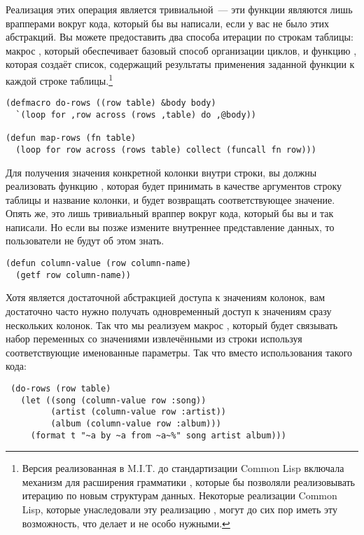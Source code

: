Реализация этих операция является тривиальной~--- эти функции являются лишь врапперами
вокруг кода, который бы вы написали, если у вас не было этих абстракций.  Вы можете
предоставить два способа итерации по строкам таблицы: макрос , который
обеспечивает базовый способ организации циклов, и функцию , которая создаёт
список, содержащий результаты применения заданной функции к каждой строке
таблицы.\footnote{Версия  реализованная в M.I.T. до стандартизации Common Lisp
  включала механизм для расширения грамматики , которые бы позволяли
  реализовывать итерацию по новым структурам данных.  Некоторые реализации Common Lisp,
  которые унаследовали эту реализацию , могут до сих пор иметь эту возможность,
  что делает  и  не особо нужными.}

\begin{lstlisting}
(defmacro do-rows ((row table) &body body)
  `(loop for ,row across (rows ,table) do ,@body))

(defun map-rows (fn table)
  (loop for row across (rows table) collect (funcall fn row)))
\end{lstlisting}

Для получения значения конкретной колонки внутри строки, вы должны реализовать функцию
, которая будет принимать в качестве аргументов строку таблицы и
название колонки, и будет возвращать соответствующее значение.  Опять же, это лишь
тривиальный враппер вокруг кода, который бы вы и так написали.  Но если вы позже измените
внутреннее представление данных, то пользователи  не будут об этом
знать.

\begin{lstlisting}
(defun column-value (row column-name)
  (getf row column-name))
\end{lstlisting}

Хотя  является достаточной абстракцией доступа к значениям колонок, вам
достаточно часто нужно получать одновременный доступ к значениям сразу нескольких колонок.
Так что мы реализуем макрос , который будет связывать набор
переменных со значениями извлечёнными из строки используя соответствующие именованные
параметры.  Так что вместо использования такого кода:

\begin{lstlisting}
 (do-rows (row table)
   (let ((song (column-value row :song))
         (artist (column-value row :artist))
         (album (column-value row :album)))
     (format t "~a by ~a from ~a~%" song artist album)))
\end{lstlisting}

